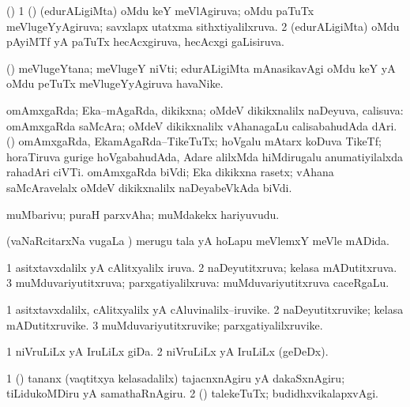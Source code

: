 \bentry
{}
\gl{\gu}
\bmng
(\AmA) 
\bnum
\num{1} (\rUpa) (edurALigiMta) oMdu keY meVlAgiruva; oMdu paTuTx meVlugeYyAgiruva; savxlapx utatxma sithxtiyalilxruva. 
\num{2} (edurALigiMta) oMdu pAyiMTf yA paTuTx hecAcxgiruva, hecAcxgi gaLisiruva. 
\enum
\emng
\eentry

\bentry
{}
\gl{\nA}
\bmng
(\AmA) meVlugeYtana; meVlugeY niVti; edurALigiMta mAnasikavAgi oMdu keY yA oMdu peTuTx meVlugeYyAgiruva havaNike. 
\emng
\eentry

\bentry
{}
\gl{\gu}
\bmng
omAmxgaRda; Eka--mAgaRda, dikikxna; oMdeV dikikxnalilx naDeyuva, calisuva:  omAmxgaRda saMcAra; oMdeV dikikxnalilx vAhanagaLu calisabahudAda dAri.  (\ame) omAmxgaRda, EkamAgaRda--TikeTuTx; hoVgalu mAtarx koDuva TikeTf; horaTiruva gurige hoVgabahudAda, Adare alilxMda hiMdirugalu anumatiyilalxda rahadAri ciVTi.  omAmxgaRda biVdi; Eka dikikxna rasetx; vAhana saMcAravelalx oMdeV dikikxnalilx naDeyabeVkAda biVdi. 
\emng
\eentry

\bentry
{}
\gl{\nA}
\bmng
muMbarivu; puraH parxvAha; muMdakekx hariyuvudu. 
\emng
\eentry

\bentry
{}
\gl{\gu}
\bmng
(vaNaRcitarxNa \mo vugaLa \vi) merugu tala yA hoLapu meVlemxY meVle mADida. 
\emng
\eentry

\bentry
{}
\gl{\gu}
\bmng
\bnum
\num{1} asitxtavxdalilx yA cAlitxyalilx iruva. 
\num{2} naDeyutitxruva; kelasa mADutitxruva. 
\num{3} muMduvariyutitxruva; parxgatiyalilxruva:  muMduvariyutitxruva caceRgaLu. 
\enum
\emng
\eentry

\bentry
{}
\gl{\nA}
\bmng
\bnum
\num{1} asitxtavxdalilx, cAlitxyalilx yA cAluvinalilx--iruvike. 
\num{2} naDeyutitxruvike; kelasa mADutitxruvike. 
\num{3} muMduvariyutitxruvike; parxgatiyalilxruvike. 
\enum
\emng
\eentry

\bentry
{}
\gl{\nA}
\bmng
\bnum
\num{1} niVruLiLx yA IruLiLx giDa. 
\num{2} niVruLiLx yA IruLiLx (geDeDx). 
\enum
\emng

\noindent
\gl{\pagu}
\bmng
\bnum
\num{1}  (\ashi) tananx (vaqtitxya kelasadalilx) tajacnxnAgiru yA dakaSxnAgiru; tiLidukoMDiru yA samathaRnAgiru. 
\num{2}  (\ashi) talekeTuTx; budidhxvikalapxvAgi. 
\enum
\emng
\eentry


